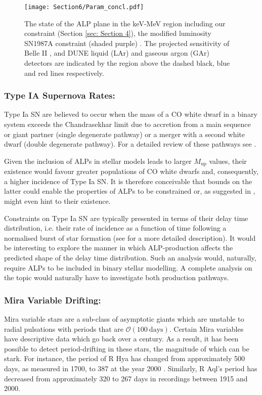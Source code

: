 \begin{figure}[t]
    \centering
    \texttt{[image: Section6/Param\_concl.pdf]}
    \caption{The state of the ALP plane in the keV-MeV region including our constraint (Section \ref{sec: Section 4}), the modified luminosity SN1987A constraint (shaded purple) \cite{Lucente:2020whw}. The projected sensitivity of Belle II \cite{Dolan:2017osp}, and DUNE liquid (LAr) and gaseous argon (GAr) detectors \cite{Brdar:2020dpr} are indicated by the region above the dashed black, blue and red lines respectively.}
    \label{fig: ALP-Decay Constraint}
\end{figure}

\subsubsection*{Type IA Supernova Rates:}
Type Ia SN are believed to occur when the mass of a CO white dwarf in a binary system exceeds the Chandrasekhar limit due to accretion from a main sequence or giant partner (single degenerate pathway) or a merger with a second white dwarf (double degenerate pathway). For a detailed review of these pathways see \cite{WANG2012122}. 

Given the inclusion of ALPs in stellar models leads to larger $M_{\mathrm{up}}$ values, their existence would favour greater populations of CO white dwarfs and, consequently, a higher incidence of Type Ia SN. It is therefore conceivable that bounds on the latter could enable the properties of ALPs to be constrained or, as suggested in \cite{Dominguez:2017mia}, might even hint to their existence.


Constraints on Type Ia SN are typically presented in terms of their delay time distribution, i.e. their rate of incidence as a function of time following a normalised burst of star formation (see \cite{doi:10.1146/annurev-astro-082812-141031} for a more detailed description). It would be interesting to explore the manner in which ALP-production affects the predicted shape of the delay time distribution. Such an analysis would, naturally, require ALPs to be included in binary stellar modelling. A complete analysis on the topic would naturally have to investigate both production pathways.


\subsubsection*{Mira Variable Drifting:}
Mira variable stars are a sub-class of asymptotic giants which are unstable to radial pulsations with periods that are $\mathcal{O}(100\ \mathrm{days})$. Certain Mira variables have descriptive data which go back over a century. As a result, it has been possible to detect period-drifting in these stars, the magnitude of which can be stark. For instance, the period of R Hya has changed from approximately 500 days, as measured in 1700, to 387 at the year 2000 \cite{AGBStarsBook}. Similarly, R Aql's period has decreased from approximately 320 to 267 days in recordings between 1915 and 2000.


